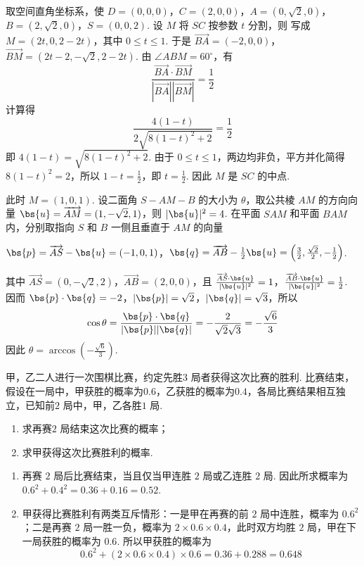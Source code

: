 \begin{solution}
取空间直角坐标系，使 \(D=(0,0,0)\)，\(C=(2,0,0)\)，\(A=(0,\sqrt{2},0)\)，\(B=(2,\sqrt{2},0)\)，\(S=(0,0,2)\). 设 \(M\) 将 \(SC\) 按参数 \(t\) 分割，则
写成 \(M=(2t,0,2-2t)\)，其中 \(0\leqslant t\leqslant1\).
于是
\(\overrightarrow{BA}=(-2,0,0)\)，\(\overrightarrow{BM}=(2t-2,-\sqrt{2},2-2t)\).
由 \(\angle ABM=60^{\circ}\)，有
\[
\frac{\overrightarrow{BA}\cdot\overrightarrow{BM}}{|\overrightarrow{BA}||\overrightarrow{BM}|}
=\frac{1}{2}
\]
计算得
\[
\frac{4(1-t)}{2\sqrt{8(1-t)^2+2}}=\frac{1}{2}
\]
即 \(4(1-t)=\sqrt{8(1-t)^2+2}\). 由于 \(0\leqslant t\leqslant1\)，两边均非负，平方并化简得 \(8(1-t)^2=2\)，所以 \(1-t=\frac{1}{2}\)，即 \(t=\frac{1}{2}\). 因此 \(M\) 是 \(SC\) 的中点.

此时 \(M=(1,0,1)\). 设二面角 \(S-AM-B\) 的大小为 \(\theta\)，取公共棱 \(AM\) 的方向向量 \(\bs{u}=\overrightarrow{AM}=(1,-\sqrt{2},1)\)，则 \(|\bs{u}|^2=4\). 在平面 \(SAM\) 和平面 \(BAM\) 内，分别取指向 \(S\) 和 \(B\) 一侧且垂直于 \(AM\) 的向量

\(\bs{p}=\overrightarrow{AS}-\bs{u}=(-1,0,1)\)，\(\bs{q}=\overrightarrow{AB}-\frac{1}{2}\bs{u}=\left(\frac{3}{2},\frac{\sqrt{2}}{2},-\frac{1}{2}\right)\).

其中 \(\overrightarrow{AS}=(0,-\sqrt{2},2)\)，\(\overrightarrow{AB}=(2,0,0)\)，且
\(\frac{\overrightarrow{AS}\cdot\bs{u}}{|\bs{u}|^2}=1\)，\(\frac{\overrightarrow{AB}\cdot\bs{u}}{|\bs{u}|^2}=\frac{1}{2}\).
因而 \(\bs{p}\cdot\bs{q}=-2\)，\(|\bs{p}|=\sqrt{2}\)，\(|\bs{q}|=\sqrt{3}\)，所以
\[
\cos\theta=\frac{\bs{p}\cdot\bs{q}}{|\bs{p}||\bs{q}|}
=-\frac{2}{\sqrt{2}\sqrt{3}}=-\frac{\sqrt{6}}{3}
\]
因此 \(\theta=\arccos\left(-\frac{\sqrt{6}}{3}\right)\).
\end{solution}

\begin{problem}
甲，乙二人进行一次围棋比赛，约定先胜\(3\text{ 局}\)者获得这次比赛的胜利. 比赛结束，假设在一局中，甲获胜的概率为\(0.6\)，乙获胜的概率为\(0.4\)，各局比赛结果相互独立，已知前\(2\text{ 局}\)中，甲，乙各胜\(1\text{ 局}\).

\begin{enumerate}
\item 求再赛\(2\text{ 局}\)结束这次比赛的概率；
\item 求甲获得这次比赛胜利的概率.
\end{enumerate}
\end{problem}

\begin{solution}
\begin{enumerate}
\item 再赛 \(2\) 局后比赛结束，当且仅当甲连胜 \(2\) 局或乙连胜 \(2\) 局. 因此所求概率为 \(0.6^2+0.4^2=0.36+0.16=0.52\).
\item 甲获得比赛胜利有两类互斥情形：一是甲在再赛的前 \(2\) 局中连胜，概率为 \(0.6^2\)；二是再赛 \(2\) 局一胜一负，概率为 \(2\times0.6\times0.4\)，此时双方均胜 \(2\) 局，甲在下一局获胜的概率为 \(0.6\). 所以甲获胜的概率为
\[
0.6^2+\left(2\times0.6\times0.4\right)\times0.6=0.36+0.288=0.648
\]
\end{enumerate}
\end{solution}

